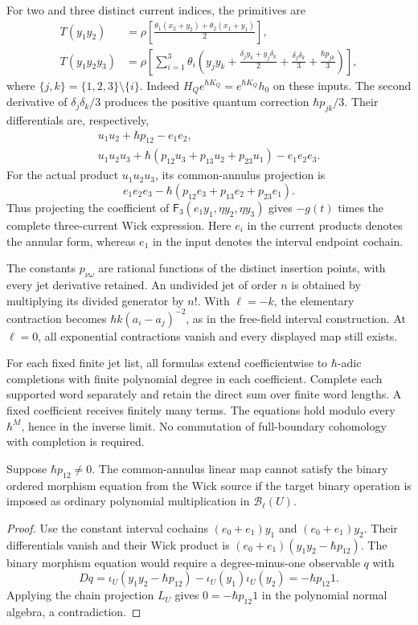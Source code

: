 For two and three distinct current indices, the primitives are
\[
 \begin{aligned}
 T(y_1y_2)&=\rho\left[
  \frac{\theta_1(x_2+y_2)+\theta_2(x_1+y_1)}2\right],\\
 T(y_1y_2y_3)&=\rho\left[
  \sum_{i=1}^3\theta_i\left(
    y_jy_k+\frac{\delta_jy_k+y_j\delta_k}{2}
      +\frac{\delta_j\delta_k}{3}+\frac{\hbar p_{jk}}3
  \right)\right],
 \end{aligned}
\]
where $\{j,k\}=\{1,2,3\}\setminus\{i\}$.
Indeed $H_Qe^{\hbar K_Q}=e^{\hbar K_Q}h_0$ on these inputs.
The second derivative of $\delta_j\delta_k/3$ produces the
positive quantum correction $\hbar p_{jk}/3$.
Their differentials are, respectively,
\[
 \begin{aligned}
 u_1u_2+\hbar p_{12}-e_1e_2,\\
 u_1u_2u_3+\hbar(p_{12}u_3+p_{13}u_2+p_{23}u_1)-e_1e_2e_3.
 \end{aligned}
\]
For the actual product $u_1u_2u_3$, its common-annulus projection is
\[
 e_1e_2e_3-\hbar(p_{12}e_3+p_{13}e_2+p_{23}e_1).
\]
Thus projecting the coefficient of
$\mathsf F_3(e_1y_1,\eta y_2,\eta y_3)$ gives $-g(t)$ times
the complete three-current Wick expression.
Here $e_i$ in the current products denotes the annular form,
whereas $e_1$ in the input denotes the interval endpoint cochain.

The constants $p_{\nu\omega}$ are rational functions of the
distinct insertion points, with every jet derivative retained.
An undivided jet of order $n$ is obtained by multiplying its divided
generator by $n!$.  With $\ell=-k$, the elementary contraction becomes
$\hbar k(a_i-a_j)^{-2}$, as in the free-field interval construction.
At $\ell=0$, all exponential contractions vanish and every displayed
map still exists.

For each fixed finite jet list, all formulas extend coefficientwise
to $\hbar$-adic completions with finite polynomial degree in each
coefficient.  Complete each supported word separately and retain
the direct sum over finite word lengths.
A fixed coefficient receives finitely many terms.
The equations hold modulo every $\hbar^M$, hence in the inverse limit.
No commutation of full-boundary cohomology with completion is required.

\begin{proposition}
\label{prop:ordered-current-annular-binary-obstruction}
Suppose $\hbar p_{12}\ne0$.  The common-annulus linear map cannot
satisfy the binary ordered morphism equation from the Wick source
if the target binary operation is imposed as ordinary polynomial
multiplication in $\mathcal B_\ell(U)$.
\end{proposition}
\begin{proof}
Use the constant interval cochains $(e_0+e_1)y_1$ and
$(e_0+e_1)y_2$.  Their differentials vanish and their Wick product
is $(e_0+e_1)(y_1y_2-\hbar p_{12})$.
The binary morphism equation would require a degree-minus-one
observable $q$ with
\[
 Dq=\iota_U(y_1y_2-\hbar p_{12})-\iota_U(y_1)\iota_U(y_2)
    =-\hbar p_{12}1.
\]
Applying the chain projection $L_U$ gives $0=-\hbar p_{12}1$
in the polynomial normal algebra, a contradiction.
\end{proof}


